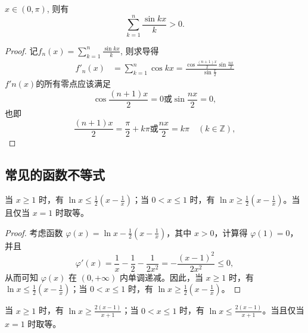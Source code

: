 \begin{theorem}
    \(x\in (0,\pi)\), 则有
    \begin{equation}\label{equ:Fejér-Jackson不等式}
        \sum_{k=1}^{n}\frac{\sin kx}{k}>0.
    \end{equation}
\end{theorem}
\begin{proof}
    记\(f_n(x)=\sum_{k=1}^{n}\frac{\sin kx}{k}\), 则求导得
    \begin{align*}
        f'_n(x)&=\sum_{k=1}^{n}\cos kx=\frac{\cos\frac{(n+1)x}{2}\sin\frac{nx}{2}}{\sin\frac{x}{2}}
    \end{align*}
    \(f'n(x)\)的所有零点应该满足
    \[\cos\frac{(n+1)x}{2}=0\text{或}\sin\frac{nx}{2}=0,\]
    也即
    \[\frac{(n+1)x}{2}=\frac{\pi}{2}+k\pi\text{或}\frac{nx}{2}=k\pi\quad(k\in\mathbb{Z}),\]








\end{proof}








\clearpage
\subsection{常见的函数不等式}
\begin{theorem}
    当 $x \geqslant 1$ 时，有 $\ln x \leqslant \frac{1}{2}\left(x - \frac{1}{x}\right)$；当 $0 < x \leqslant 1$ 时，有 $\ln x \geqslant \frac{1}{2}\left(x - \frac{1}{x}\right)$。当且仅当 $x = 1$ 时取等。
\end{theorem}
\begin{proof}
    考虑函数 $\varphi(x) = \ln x - \frac{1}{2}\left(x - \frac{1}{x}\right)$，其中 $x > 0$，计算得 $\varphi(1) = 0$，并且
\[
\varphi'(x) = \frac{1}{x} - \frac{1}{2} - \frac{1}{2x^2} = -\frac{(x-1)^2}{2x^2} \leqslant 0,
\]
从而可知 $\varphi(x)$ 在 $(0, +\infty)$ 内单调递减。因此，当 $x \geqslant 1$ 时，有 $\ln x \leqslant \frac{1}{2}\left(x - \frac{1}{x}\right)$；当 $0 < x \leqslant 1$ 时，有 $\ln x \geqslant \frac{1}{2}\left(x - \frac{1}{x}\right)$。
\end{proof}
\begin{theorem}
    当 $x \geqslant 1$ 时，有 $\ln x \geqslant \frac{2(x-1)}{x+1}$；当 $0 < x \leqslant 1$ 时，有 $\ln x \leqslant \frac{2(x-1)}{x+1}$。当且仅当 $x = 1$ 时取等。
\end{theorem}

